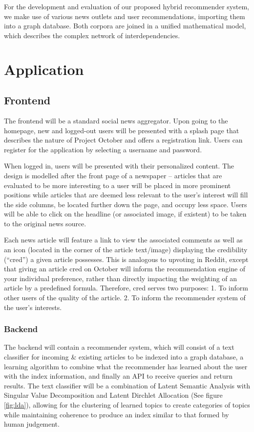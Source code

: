 \documentclass[11pt,letterpaper]{article}
\begin{document}
For the development and evaluation of our proposed hybrid recommender system, we make use of various news outlets and user recommendations, importing them into a graph database.
Both corpora are joined in a unified mathematical model, which describes the complex network of interdependencies.

\section{Application}
\subsection{Frontend}
The frontend will be a standard social news aggregator.
Upon going to the homepage, new and logged-out users will be presented with a splash page that describes the nature of Project October and offers a registration link.
Users can register for the application by selecting a username and password.

When logged in, users will be presented with their personalized content.
The design is modelled after the front page of a newspaper -- articles that are evaluated to be more interesting to a user will be placed in more prominent positions while articles that are deemed less relevant to the user's interest will fill the side columns, be located further down the page, and occupy less space.
Users will be able to click on the headline (or associated image, if existent) to be taken to the original news source.

Each news article will feature a link to view the associated comments as well as an icon (located in the corner of the article text/image) displaying the credibility (``cred'') a given article possesses.
This is analogous to upvoting in Reddit, except that giving an article cred on October will inform the recommendation engine of your individual preference, rather than directly impacting the weighting of an article by a predefined formula. Therefore, cred serves two purposes: 1. To inform other users of the quality of the article. 2. To inform the recommender system of the user's interests. 

\subsubsection{Backend}

The backend will contain a recommender system, which will consist of a text
classifier for incoming \& existing articles to be indexed into a graph
database, a learning algorithm to combine what the recommender has learned about
the user with the index information, and finally an API to receive queries and
return results. The text classifier will be a combination of Latent Semantic
Analysis with Singular Value Decomposition and Latent Dirchlet Allocation
\cite{lda}(See figure \ref{fig:lda}), allowing for the clustering of learned topics to create categories
of topics while maintaining coherence to produce an index similar to that formed
by human judgement. 
\end{document}
